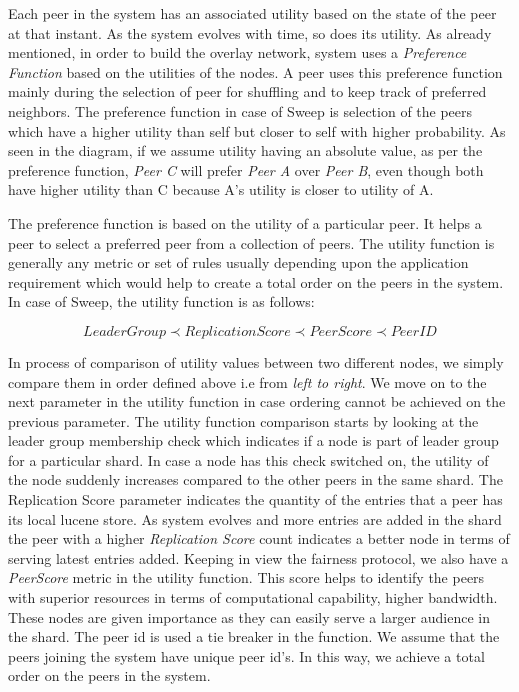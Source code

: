 \documentclass[a4paper, 11pt]{article}
\begin{document}
Each peer in the system has an associated utility based on the state of the peer at that instant. As the system evolves with time, so does its utility. As already mentioned, in order to build the overlay network, system uses a \textit {Preference Function} based on the utilities of the nodes. A peer uses this preference function mainly during the selection of peer for shuffling and to keep track of preferred neighbors. The preference function in case of  Sweep is selection of the peers which have a higher utility than self but closer to self with higher probability. As seen in the diagram, if we assume utility having an absolute value, as per the preference function, \textit{Peer C} will prefer \textit{Peer A} over \textit{Peer B}, even though both have higher utility than C because A's utility is closer to utility of A.

\par The preference function is based on the utility of a particular peer. It helps a peer to select a preferred peer from a collection of peers. The utility function is generally any metric or set of rules usually depending upon the application requirement which would help to create a total order on the peers in the system. In case of Sweep, the utility function is as follows:

\small 
\begin{equation*}
    LeaderGroup \prec ReplicationScore \prec PeerScore \prec PeerID
\end{equation*}
\normalsize

In process of comparison of utility values between two different nodes, we simply compare them in order defined above i.e from \textit {left to right}. We move on to the next parameter in the utility function in case ordering cannot be achieved on the previous parameter. The utility function comparison starts by looking at the leader group membership check which indicates if a node is part of leader group for a particular shard. In case a node has this check switched on, the utility of the node suddenly increases compared to the other peers in the same shard. The Replication Score parameter indicates the quantity of the entries that a peer has its local lucene store. As system evolves and more entries are added in the shard the peer with a higher \textit{Replication Score} count indicates a better node in terms of serving latest entries added. Keeping in view the fairness protocol, we also have a \textit{PeerScore} metric in the utility function. This score helps to identify the peers with superior resources in terms of computational capability, higher bandwidth. These nodes are given importance as they can easily serve a larger audience in the shard. The peer id is used a tie breaker in the function. We assume that the peers joining the system have unique peer id's.  In this way, we achieve a total order on the peers in the system.
\end{document}
